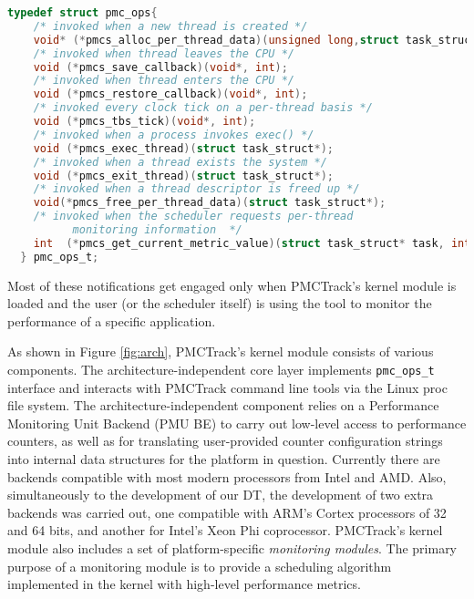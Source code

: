\begin{minipage}{\linewidth}
  \begin{lstlisting}[frame=single,language=C]
  typedef struct pmc_ops{
    /* invoked when a new thread is created */
    void* (*pmcs_alloc_per_thread_data)(unsigned long,struct task_struct*);
    /* invoked when thread leaves the CPU */
    void (*pmcs_save_callback)(void*, int);
    /* invoked when thread enters the CPU */
    void (*pmcs_restore_callback)(void*, int);
    /* invoked every clock tick on a per-thread basis */
    void (*pmcs_tbs_tick)(void*, int);
    /* invoked when a process invokes exec() */
    void (*pmcs_exec_thread)(struct task_struct*);
    /* invoked when a thread exists the system */
    void (*pmcs_exit_thread)(struct task_struct*);
    /* invoked when a thread descriptor is freed up */
    void(*pmcs_free_per_thread_data)(struct task_struct*);
    /* invoked when the scheduler requests per-thread
          monitoring information  */
    int  (*pmcs_get_current_metric_value)(struct task_struct* task, int key, uint64_t* value);
  } pmc_ops_t;
  \end{lstlisting}
\end{minipage}


Most of these notifications get engaged only when PMCTrack's kernel
module is loaded and the user (or the scheduler itself) is using the
tool to monitor the performance of a specific application.

As shown in Figure \ref{fig:arch}, PMCTrack's kernel module consists of
various components. The architecture-independent core layer implements
\texttt{pmc\_ops\_t} interface and interacts with PMCTrack command line
tools via the Linux proc file system. The architecture-independent
component relies on a Performance Monitoring Unit Backend (PMU BE) to
carry out low-level access to performance counters, as well as for
translating user-provided counter configuration strings into internal
data structures for the platform in question. Currently there are
backends compatible with most modern processors from Intel and AMD.
Also, simultaneously to the development of our DT, the development of
two extra backends was carried out, one compatible with ARM's Cortex
processors of 32 and 64 bits, and another for Intel's Xeon Phi
coprocessor. PMCTrack's kernel module also includes a set of
platform-specific \textit{monitoring modules}. The primary purpose of a
monitoring module is to provide a scheduling algorithm implemented in
the kernel with high-level performance metrics.

